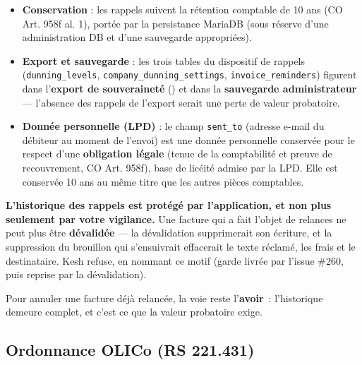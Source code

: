 \documentclass[a4paper,11pt,oneside]{article}
\begin{document}
\begin{itemize}
    \item \textbf{Conservation} : les rappels suivent la rétention comptable de 10 ans (CO Art. 958f al. 1), portée par la persistance MariaDB (sous réserve d'une administration DB et d'une sauvegarde appropriées).
    \item \textbf{Export et sauvegarde} : les trois tables du dispositif de rappels (\texttt{dunning\_levels}, \texttt{company\_dunning\_settings}, \texttt{invoice\_reminders}) figurent dans l'\textbf{export de souveraineté} () et dans la \textbf{sauvegarde administrateur} — l'absence des rappels de l'export serait une perte de valeur probatoire.
    \item \textbf{Donnée personnelle (LPD)} : le champ \texttt{sent\_to} (adresse e-mail du débiteur au moment de l'envoi) est une donnée personnelle conservée pour le respect d'une \textbf{obligation légale} (tenue de la comptabilité et preuve de recouvrement, CO Art. 958f), base de licéité admise par la LPD. Elle est conservée 10 ans au même titre que les autres pièces comptables.
\end{itemize}

\begin{keshwarning}
\textbf{L'historique des rappels est protégé par l'application, et non plus seulement par votre vigilance.} Une facture qui a fait l'objet de relances ne peut plus être \textbf{dévalidée} --- la dévalidation supprimerait son écriture, et la suppression du brouillon qui s'ensuivrait effacerait le texte réclamé, les frais et le destinataire. Kesh refuse, en nommant ce motif (garde livrée par l'issue \#260, puis reprise par la dévalidation).

Pour annuler une facture déjà relancée, la voie reste l'\textbf{avoir}~: l'historique demeure complet, et c'est ce que la valeur probatoire exige.
\end{keshwarning}

\subsection{Ordonnance OLICo (RS 221.431)}
\end{document}
